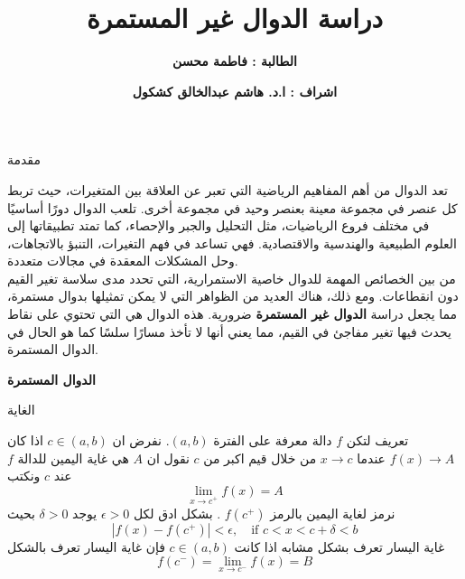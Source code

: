 

\title{\textbf{دراسة الدوال غير المستمرة}}
\author{\textbf{الطالبة : فاطمة محسن}}
\date{\textbf{اشراف : ا.د. هاشم عبدالخالق كشكول}}


	\abovedisplayskip=7pt
	\belowdisplayskip=7pt
	\maketitle
	
	\timesfont
	
	\begin{frame}{مقدمة}
		
		تعد الدوال من أهم المفاهيم الرياضية التي تعبر عن العلاقة بين المتغيرات، حيث تربط كل عنصر في مجموعة معينة بعنصر وحيد في مجموعة أخرى. تلعب الدوال دورًا أساسيًا في مختلف فروع الرياضيات، مثل التحليل والجبر والإحصاء، كما تمتد تطبيقاتها إلى العلوم الطبيعية والهندسية والاقتصادية. فهي تساعد في فهم التغيرات، التنبؤ بالاتجاهات، وحل المشكلات المعقدة في مجالات متعددة.\\[10pt]
		
		\pause
		من بين الخصائص المهمة للدوال خاصية الاستمرارية، التي تحدد مدى سلاسة تغير القيم دون انقطاعات. ومع ذلك، هناك العديد من الظواهر التي لا يمكن تمثيلها بدوال مستمرة، مما يجعل دراسة \textbf{الدوال غير المستمرة} ضرورية. هذه الدوال هي التي تحتوي على نقاط يحدث فيها تغير مفاجئ في القيم، مما يعني أنها لا تأخذ مسارًا سلسًا كما هو الحال في الدوال المستمرة.
	\end{frame}
	
	\begin{frame}
		\begin{center}
			\Huge
			\textbf{الدوال المستمرة}
		\end{center}
	\end{frame}
	
	\begin{frame}{الغاية}
		\begin{exampleblock}{تعريف}
				لتكن $f$ دالة معرفة على الفترة $(a, b)$. نفرض ان $c\in (a,b)$ اذا كان
			$f(x) \to A$ عندما $x\to c$ من خلال قيم اكبر من $c$ نقول ان $A$ هي غاية اليمين للدالة $f$ عند $c$ ونكتب
			\[
			\lim\limits_{x \to c^+} f(x) = A
			\]
			نرمز لغاية اليمين بالرمز $f(c^+)$ . بشكل ادق لكل $\epsilon>0$ يوجد $\delta>0$ بحيث
			\[
			|f(x) - f(c^+)| < \epsilon, \quad \text{if}\,\, c<x<c+\delta<b
			\]
			غاية اليسار تعرف بشكل مشابه اذا كانت $c\in (a, b)$ فإن غاية اليسار تعرف بالشكل 
			\[
			f(c^-) = \lim\limits_{x \to c^-} f(x) = B
			\]
		\end{exampleblock}
	\end{frame}
	
